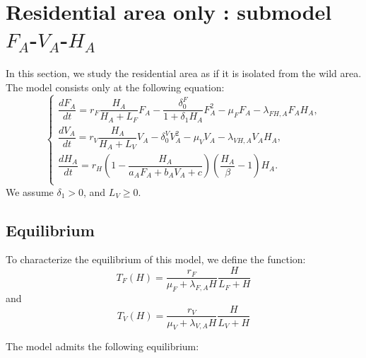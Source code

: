 \documentclass{article}
\newcommand{\lfa}{\lambda_{F, A}}
\newcommand{\lva}{\lambda_{V, A}}
\begin{document}
\section{Residential area only : submodel $F_A$-$V_A$-$H_A$}
In this section, we study the residential area as if it is isolated from the wild area. The model consists only at the following equation: 
\begin{equation}
\left\{ \begin{array}{l}
\dfrac{dF_{A}}{dt}=r_F  \dfrac{H_A}{H_A+L_F}F_A - \dfrac{\delta_0^F}{1 +\delta_1 H_A}F_A^2-\mu_{F}F_A-\lambda_{FH,A}F_AH_A,\\
\dfrac{dV_{A}}{dt}=r_V  \dfrac{H_A}{H_A+L_V}V_A - \delta_0^V V_A^2-\mu_{V}V_A-\lambda_{VH,A}V_AH_A,\\
\dfrac{dH_A}{dt}=r_{H}\left(1-\dfrac{H_A}{a_{A}F_{A} + b_A V_A +c}\right)\left(\dfrac{H_A}{\beta}-1\right)H_A. \\
\end{array}\right.
\label{anthropicFVH}
\end{equation}
We assume $\delta_1 > 0$, and $L_V \geq 0$.

\subsection{Equilibrium}

To characterize the equilibrium of this model, we define the function:
\begin{equation*}
T_F(H) = \dfrac{r_F}{\mu_F + \lfa H} \dfrac{H}{L_F + H}
\end{equation*}
and
\begin{equation*}
T_V(H) = \dfrac{r_V}{\mu_V + \lva H} \dfrac{H}{L_V + H}
\end{equation*}

The model admits the following equilibrium:
\end{document}
